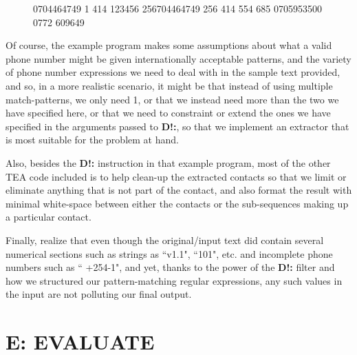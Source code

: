 \documentclass[a4paper, 18pt]{book} %
\begin{document}
\begin{figure}[H]
  \centering
  \begin{tcolorbox}[title=Sample EXTRACTED Output Text Containing Phone Contacts,  breakable,listing options={basicstyle=\ttfamily, breaklines=true, breakatwhitespace=true}]
0704464749 1 414 123456 256704464749 256 414 554 685 0705953500 0772 609649
  \end{tcolorbox}
\end{figure}

Of course, the example program makes some assumptions about what a valid phone number might be given internationally acceptable patterns, and the variety of phone number expressions we need to deal with in the sample text provided, and so, in a more realistic scenario, it might be that instead of using multiple match-patterns, we only need 1, or that we instead need more than the two we have specified here, or that we need to constraint or extend the ones we have specified in the arguments passed to \textbf{D!:}, so that we implement an extractor that is most suitable for the problem at hand.

\vspace{1em}


Also, besides the \textbf{D!:} instruction in that example program, most of the other TEA code included is to help clean-up the extracted contacts so that we limit or eliminate anything that is not part of the contact, and also format the result with minimal white-space between either the contacts or the sub-sequences making up a particular contact.

\vspace{1em}

Finally, realize that even though the original/input text did contain several numerical sections such as strings as ``v1.1", ``101", etc. and incomplete phone numbers such as `` +254-1", and yet, thanks to the power of the \textbf{D!:} filter and how we structured our pattern-matching regular expressions, any such values in the input are not polluting our final output.



 
\chapter{E: EVALUATE}
\label{CHAPE}
\end{document}
